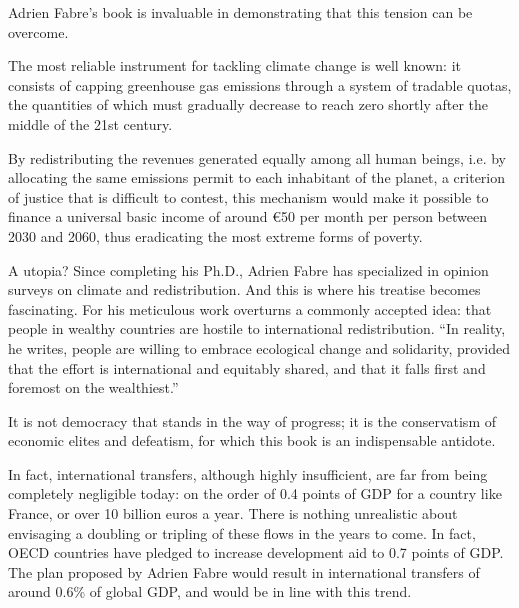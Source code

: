 \documentclass[a5paper,english,openany]{memoir}
\begin{document}
Adrien Fabre's book is invaluable in demonstrating that this tension can be overcome. 

The most reliable instrument for tackling climate change is well known: it consists of capping greenhouse gas emissions through a system of tradable quotas, the quantities of which must gradually decrease to reach zero shortly after the middle of the 21st century. 

By redistributing the revenues generated equally among all human beings, i.e. by allocating the same emissions permit to each inhabitant of the planet, a criterion of justice that is difficult to contest, %
this mechanism would make it possible to finance a universal basic income of around \euro{}50 per month per person between 2030 and 2060, thus eradicating the most extreme forms of poverty. 

A utopia? Since completing his Ph.D., Adrien Fabre has specialized %
in opinion surveys on climate and redistribution. And this is where his treatise becomes fascinating. For his meticulous work overturns a commonly accepted idea: %
that people in wealthy countries are hostile to international redistribution. ``In reality, he writes, people are willing to embrace ecological change and solidarity, provided that the effort is international and equitably shared, and that it falls first and foremost on the wealthiest.''

It is not democracy that stands in the way of progress; %
it is the conservatism of economic elites and defeatism, for which this book is an indispensable antidote.

In fact, international transfers, although highly insufficient, are far from being completely negligible today: %
on the order of 0.4 points of GDP for a country like France, or over 10 billion euros a year. There is nothing unrealistic about envisaging a doubling or tripling of these flows in the years to come. In fact, OECD countries have pledged to increase development aid to 0.7 points of GDP. The plan proposed by Adrien Fabre would result in international
transfers of around 0.6\% of global GDP, and would be in line with this trend. 
\end{document}
